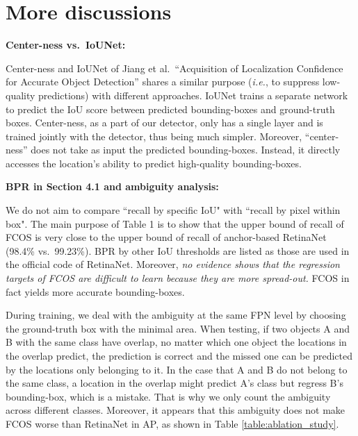 
\def\Ours{{FCOS}\xspace}
\def\eg{{\it e.g.}\xspace}
\def\ie{{\it i.e.}\xspace}




\section{More discussions}
\noindent\textbf{Center-ness vs.\ IoUNet:}


 Center-ness and IoUNet of Jiang et al.\ ``Acquisition of Localization Confidence for Accurate Object Detection''
  shares a similar purpose (\ie, to suppress low-quality predictions) with different approaches.
  IoUNet trains a separate network to predict the IoU score between predicted bounding-boxes and ground-truth boxes. Center-ness, as a part of our
   detector, only has a single layer and is trained jointly with the detector, thus being much simpler. Moreover, ``center-ness'' does not take as input the predicted bounding-boxes. Instead, it directly accesses the location's ability to predict high-quality bounding-boxes.

\noindent\textbf{BPR in Section 4.1 and ambiguity analysis:}

 We do not aim to compare ``recall by specific IoU" with ``recall by pixel within box".
 The main purpose of Table 1 is to show that the upper bound of recall of \Ours is very close to the upper bound of recall of anchor-based RetinaNet (98.4\%  vs.\ 99.23\%).
 BPR by other IoU thresholds are listed as those
  are used in the official code of RetinaNet. Moreover, \textit{no evidence shows that the regression targets of \Ours are difficult to learn because they are more spread-out.}  \Ours in fact yields more accurate bounding-boxes.



 During training, we deal with the ambiguity at the same FPN level by choosing the ground-truth
  box with the minimal area. When testing, if two objects A and B with the same class have overlap,
  no matter which one object the locations in the overlap predict, the prediction is correct and the missed one can be predicted by the locations only belonging to it. In the case that A and B do not belong to the same class,
  a location in the overlap might predict A's class but regress B's bounding-box, which is a mistake.
  That is why we only count the ambiguity across different classes. Moreover,
it appears that
  {this ambiguity does not make \Ours worse than RetinaNet in AP, as shown in Table \ref{table:ablation_study}.}

